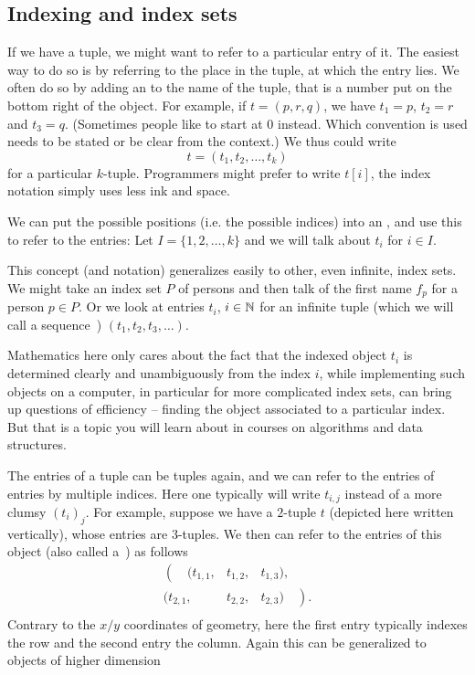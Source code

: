 \subsection{Indexing and index sets}

If we have a tuple, we might want to refer to a
particular entry of it. The easiest way to do so is by referring to the
place in the tuple, at which the entry lies. We often do so by adding an
 to the name of the tuple, 
that is a number put on the bottom right of the object. For
example, if $t=(p,r,q)$, we have $t_1=p$, $t_2=r$ and $t_3=q$. (Sometimes
people like to start at $0$ instead. Which convention is used needs to be
stated or be clear from the context.) We thus could write 
\[
t=(t_1,t_2,\ldots,t_k)
\]
for a particular $k$-tuple. Programmers might prefer to write $t[i]$, the
index notation simply uses less ink and space.
\smallskip

We can put the possible positions (i.e. the possible indices) into an 
, and use this to refer to the entries: Let
$I=\{1,2,\ldots,k\}$ and we will talk about $t_i$
for $i\in I$.  
\smallskip

This concept (and notation) generalizes easily to other, even infinite, index
sets. We might take an index set $P$ of persons and then talk of the first
name $f_p$ for a person $p\in P$. Or we look at entries $t_i$, $i\in{\mathbb N}$ for
an infinite tuple (which we will call a sequence~)
$(t_1,t_2,t_3,\ldots)$.

Mathematics here only cares about the fact that the indexed object $t_i$ is
determined clearly and unambiguously from the index $i$, while implementing
such objects on a computer, in particular for more complicated index sets,
can bring up questions of efficiency -- finding the object associated to a
particular index.  But that is a topic you will learn about in courses on
algorithms and data structures.
\medskip

The entries of a tuple can be tuples again, and we can refer to the entries
of entries by multiple indices. Here one typically will write $t_{i,j}$
instead of a more clumsy $(t_i)_j$.
For example, suppose we have a $2$-tuple $t$
(depicted here written vertically), whose entries are $3$-tuples. We then
can refer to the entries of this object (also called a~) as
follows
\[
\begin{array}{rcl}
\left(\quad(t_{1,1},\right.&t_{1,2},&t_{1,3}),\\
(t_{2,1},&t_{2,2},&t_{2,3})\left.\quad\right).\\
\end{array}
\]
Contrary to the $x/y$ coordinates of geometry, here the first entry
typically indexes the row and the second entry the column. Again this can
be generalized to objects of higher dimension

